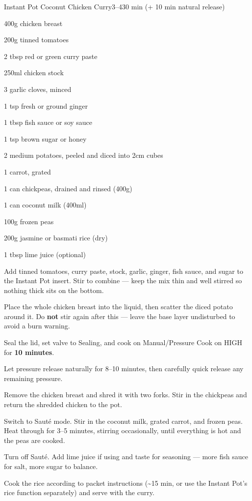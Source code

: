 \begin{recipebox}{Instant Pot Coconut Chicken Curry}{3--4}{30 min (+ 10 min natural release)}

\begin{ingredients}
  \item 400g chicken breast
  \item 200g tinned tomatoes
  \item 2 tbsp red or green curry paste
  \item 250ml chicken stock
  \item 3 garlic cloves, minced
  \item 1 tsp fresh or ground ginger
  \item 1 tbsp fish sauce or soy sauce
  \item 1 tsp brown sugar or honey
  \item 2 medium potatoes, peeled and diced into 2cm cubes
  \item 1 carrot, grated
  \item 1 can chickpeas, drained and rinsed (400g)
  \item 1 can coconut milk (400ml)
  \item 100g frozen peas
  \item 200g jasmine or basmati rice (dry)
  \item 1 tbsp lime juice (optional)
\end{ingredients}

\begin{method}
  \item Add tinned tomatoes, curry paste, stock, garlic, ginger, fish sauce, and sugar to the Instant Pot insert. Stir to combine --- keep the mix thin and well stirred so nothing thick sits on the bottom.
  \item Place the whole chicken breast into the liquid, then scatter the diced potato around it. Do \textbf{not} stir again after this --- leave the base layer undisturbed to avoid a burn warning.
  \item Seal the lid, set valve to Sealing, and cook on Manual/Pressure Cook on HIGH for \textbf{10 minutes}.
  \item Let pressure release naturally for 8--10 minutes, then carefully quick release any remaining pressure.
  \item Remove the chicken breast and shred it with two forks. Stir in the chickpeas and return the shredded chicken to the pot.
  \item Switch to Saut\'{e} mode. Stir in the coconut milk, grated carrot, and frozen peas. Heat through for 3--5 minutes, stirring occasionally, until everything is hot and the peas are cooked.
  \item Turn off Saut\'{e}. Add lime juice if using and taste for seasoning --- more fish sauce for salt, more sugar to balance.
  \item Cook the rice according to packet instructions (\textasciitilde15 min, or use the Instant Pot's rice function separately) and serve with the curry.
\end{method}


\end{recipebox}
